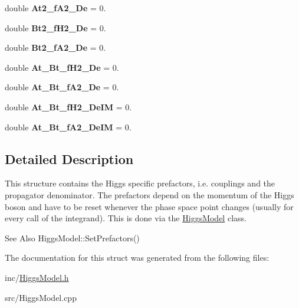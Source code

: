 \begin{DoxyCompactItemize}
\item 
\hypertarget{structHiggsPrefactors_a746d2ffd6c45dcdc4327a882d60a7f00}{double {\bfseries At2\-\_\-f\-A2\-\_\-\-De} = 0.}\label{structHiggsPrefactors_a746d2ffd6c45dcdc4327a882d60a7f00}

\item 
\hypertarget{structHiggsPrefactors_a28e6599f560ee1403abf1309d27f26e9}{double {\bfseries Bt2\-\_\-f\-H2\-\_\-\-De} = 0.}\label{structHiggsPrefactors_a28e6599f560ee1403abf1309d27f26e9}

\item 
\hypertarget{structHiggsPrefactors_a894d0baffbd6d76931cc9be61045dfd8}{double {\bfseries Bt2\-\_\-f\-A2\-\_\-\-De} = 0.}\label{structHiggsPrefactors_a894d0baffbd6d76931cc9be61045dfd8}

\item 
\hypertarget{structHiggsPrefactors_ab9024702de8509302dd74bdadf053f87}{double {\bfseries At\-\_\-\-Bt\-\_\-f\-H2\-\_\-\-De} = 0.}\label{structHiggsPrefactors_ab9024702de8509302dd74bdadf053f87}

\item 
\hypertarget{structHiggsPrefactors_a54f50c68645cb1897f2cc4031ecac7fd}{double {\bfseries At\-\_\-\-Bt\-\_\-f\-A2\-\_\-\-De} = 0.}\label{structHiggsPrefactors_a54f50c68645cb1897f2cc4031ecac7fd}

\item 
\hypertarget{structHiggsPrefactors_a9bd065464919ebbf509d5074dfbfb565}{double {\bfseries At\-\_\-\-Bt\-\_\-f\-H2\-\_\-\-De\-I\-M} = 0.}\label{structHiggsPrefactors_a9bd065464919ebbf509d5074dfbfb565}

\item 
\hypertarget{structHiggsPrefactors_a17aff31a83e303235ac71111b7ecb5a5}{double {\bfseries At\-\_\-\-Bt\-\_\-f\-A2\-\_\-\-De\-I\-M} = 0.}\label{structHiggsPrefactors_a17aff31a83e303235ac71111b7ecb5a5}

\end{DoxyCompactItemize}


\subsection{Detailed Description}
This structure contains the Higgs specific prefactors, i.\-e. couplings and the propagator denominator. The prefactors depend on the momentum of the Higgs boson and have to be reset whenever the phase space point changes (usually for every call of the integrand). This is done via the \hyperlink{classHiggsModel}{Higgs\-Model} class. \begin{DoxySeeAlso}{See Also}
Higgs\-Model\-::\-Set\-Prefactors() 
\end{DoxySeeAlso}


The documentation for this struct was generated from the following files\-:\begin{DoxyCompactItemize}
\item 
inc/\hyperlink{HiggsModel_8h}{Higgs\-Model.\-h}\item 
src/Higgs\-Model.\-cpp\end{DoxyCompactItemize}
